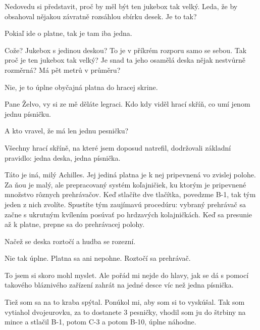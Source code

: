 \documentclass[12pt]{article}
\begin{document}
\begin{description}[itemsep=0pt]
\item[A:] Nedovedu si představit, proč by měl být ten jukebox tak velký.
    Leda, že by obsahoval nějakou závratně rozsáhlou sbírku desek. Je to tak?

\item[Ž:] Pokiaľ ide o platne, tak je tam iba jedna.

\item[A:] Cože? Jukebox s jedinou deskou? To je v příkrém rozporu samo se sebou.
    Tak proč je ten jukebox tak velký? Je snad ta jeho osamělá deska nějak
    nestvůrně rozměrná? Má pět metrů v průměru?

\item[Ž:] Nie, je to úplne obyčajná platna do hracej skrine.

\item[A:] Pane Želvo, vy si ze mě děláte legraci. Kdo kdy viděl hrací
    skříň, co umí jenom jednu písničku.

\item[Ž:] A kto vravel, že má len jednu pesničku?

\item[A:] Všechny hrací skříně, na které jsem doposud natrefil, dodržovali základní
    pravidlo: jedna deska, jedna písnička.

\item[Ž:] Táto je iná, milý Achilles. Jej jediná platna je k nej pripevnená vo 
    zvislej polohe. Za ňou je malý, ale prepracovaný systém koľajničiek, ku ktorým 
    je pripevnené množstvo rôznych prehrávačov. Keď stlačíte dve tlačítka, povedzme 
    B-1, tak tým jeden z nich zvolíte. Spustíte tým zaujímavú procedúru: vybraný 
    prehrávač sa začne s ukrutným kvílením posúvať po hrdzavých kolajničkách. Keď 
    sa presunie až k platne, prepne sa do prehrávacej polohy.

\item[A:] Načež se deska roztočí a hudba se rozezní.

\item[Ž:] Nie tak úplne. Platna sa ani nepohne. Roztočí sa prehrávač.

\item[A:] To jsem si skoro mohl myslet. Ale pořád mi nejde do hlavy, jak
    se dá s pomocí takového bláznivého zařízení zahrát na jedné desce víc než
    jedna písnička.

\item[Ž:] Tiež som sa na to kraba spýtal. Ponúkol mi, aby som si to vyskúšal. 
    Tak som vytiahol dvojeurovku, za to dostanete 3 pesničky, vhodil som ju do štrbiny 
    na mince a stlačil B-1, potom C-3 a potom B-10, úplne náhodne.


\end{description}
\end{document}
